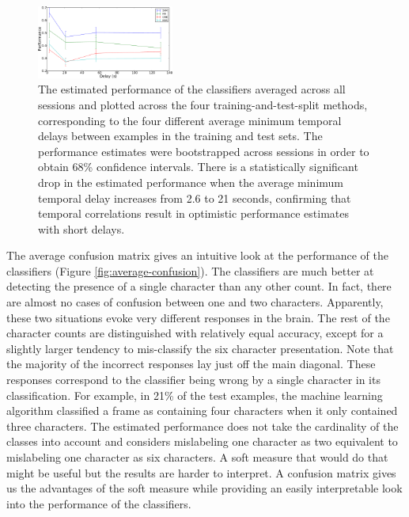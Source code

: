 \documentclass[5p,authoryear]{elsarticle}
\begin{document}
\begin{figure}
\centering
\includegraphics[width=0.4\textwidth]{figures/performance-verse-temporal-distance}
\caption{The estimated performance of the classifiers averaged across all sessions and plotted across the four training-and-test-split methods, corresponding to the four different average minimum temporal delays between examples in the training and test sets. 
The performance estimates were bootstrapped across sessions in order to obtain 68\% confidence intervals.
There is a statistically significant drop in the estimated performance when the average minimum temporal delay increases from 2.6 to 21 seconds, confirming that temporal correlations result in optimistic performance estimates with short delays.}
\label{fig:performance-verse-temporal-distance}
\end{figure}

The average confusion matrix gives an intuitive look at the performance of the classifiers (Figure \ref{fig:average-confusion}).
The classifiers are much better at detecting the presence of a single character than any other count.
In fact, there are almost no cases of confusion between one and two characters.
Apparently, these two situations evoke very different responses in the brain.
The rest of the character counts are distinguished with relatively equal accuracy,
except for a slightly larger tendency to mis-classify the six character presentation.
Note that the majority of the incorrect responses lay just off the main diagonal.
These responses correspond to the classifier being wrong by a single character in its classification.
For example, in 21\% of the test examples, the machine learning algorithm classified a frame as containing four characters when it only contained three characters.
The estimated performance does not take the cardinality of the classes into account and considers mislabeling one character as two equivalent to mislabeling one character as six characters.
A soft measure that would do that might be useful but the results are harder to interpret.
A confusion matrix gives us the advantages of the soft measure while providing an easily interpretable look into the performance of the classifiers.
\end{document}
